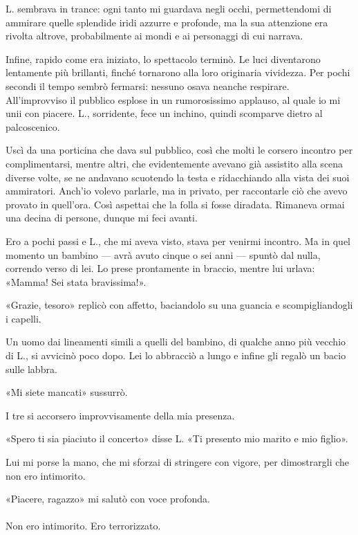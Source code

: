 \documentclass[a4paper,12pt]{book}
\begin{document}
L. sembrava in trance: ogni tanto mi guardava negli occhi, permettendomi di
ammirare quelle splendide iridi azzurre e profonde, ma la sua attenzione era
rivolta altrove, probabilmente ai mondi e ai personaggi di cui narrava.

Infine, rapido come era iniziato, lo spettacolo terminò. Le luci diventarono
lentamente più brillanti, finché tornarono alla loro originaria vividezza. Per
pochi secondi il tempo sembrò fermarsi: nessuno osava neanche respirare.
All'improvviso il pubblico esplose in un rumorosissimo applauso, al quale io mi
unii con piacere. L., sorridente, fece un inchino, quindi scomparve dietro al
palcoscenico.

Uscì da una porticina che dava sul pubblico, così che molti le corsero incontro
per complimentarsi, mentre altri, che evidentemente avevano già assistito alla
scena diverse volte, se ne andavano scuotendo la testa e ridacchiando alla vista
dei suoi ammiratori. Anch'io volevo parlarle, ma in privato, per raccontarle ciò
che avevo provato in quell'ora. Così aspettai che la folla si fosse diradata.
Rimaneva ormai una decina di persone, dunque mi feci avanti.

Ero a pochi passi e L., che mi aveva visto, stava per venirmi incontro. Ma in
quel momento un bambino --- avrà avuto cinque o sei anni --- spuntò dal nulla,
correndo verso di lei. Lo prese prontamente in braccio, mentre lui urlava:
«Mamma! Sei stata bravissima!».

«Grazie, tesoro» replicò con affetto, baciandolo su una guancia e
scompigliandogli i capelli.

Un uomo dai lineamenti simili a quelli del bambino, di qualche anno più vecchio
di L., si avvicinò poco dopo. Lei lo abbracciò a lungo e infine gli regalò un
bacio sulle labbra.

«Mi siete mancati» sussurrò.

I tre si accorsero improvvisamente della mia presenza.

«Spero ti sia piaciuto il concerto» disse L. «Ti presento mio marito e mio
figlio».

Lui mi porse la mano, che mi sforzai di stringere con vigore, per dimostrargli
che non ero intimorito.

«Piacere, ragazzo» mi salutò con voce profonda.

\paragraph{}
Non ero intimorito. Ero terrorizzato.
\end{document}
